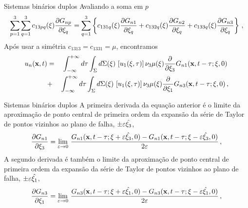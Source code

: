 \documentclass{beamer}
\newcommand{\xvec}{\mathbf{x}}
\newcommand{\xivec}{\boldmath \xi}
\begin{document}
\begin{frame}{Sistemas binários duplos}
	\small
	Avaliando a soma em $p$ 
	\begin{eqnarray*}
		\sum_{p=1}^{3} \sum_{q=1}^{3} c_{13pq}(\xivec) \frac{\partial G_{np} }{\partial \xi_q}  = \sum_{q=1}^{3}\left\{ c_{131q}(\xivec) \frac{\partial  G_{n1}}{\partial \xi_q} +  c_{132q}(\xivec) \frac{\partial G_{n2}}{\partial \xi_q}  + c_{133q}(\xivec) \frac{\partial G_{n3}}{\partial \xi_q}  \right\} \, ,
	\end{eqnarray*}
Ap\'os usar a sim\'etria $c_{1313} = c_{1331} = \mu$, encontramos
\begin{eqnarray}
\label{feq12}
u_{n}(\xvec,t) &=& \int_{-\infty }^{+\infty}d\tau\int_{\Sigma}d\Sigma(\xivec) 
\, \left[ u_{1}(\xivec,\tau)\right] \nu_{3} \mu(\xivec) \frac{\partial }{\partial \xi_3}G_{n1}(\xvec,t-\tau;\xivec,0) \, \nonumber\\
&+&\int_{-\infty }^{+\infty}d\tau\int_{\Sigma}d\Sigma(\xivec) 
\, \left[ u_{1}(\xivec,\tau)\right] \nu_{3} \mu(\xivec) \frac{\partial}{\partial \xi_1}G_{n3}(\xvec,t-\tau;\xivec,0)  \, ,  \nonumber            
\end{eqnarray}
	
\end{frame}
\begin{frame}{Sistemas binários duplos}
		\justifying
A primeira derivada da equação anterior \'e o limite 
	da aproxima\c{c}\~ao de ponto central de primeira ordem da expans\~ao da s\'erie de Taylor de pontos vizinhos 
	ao plano de falha, $\pm\varepsilon\hat{\xivec_3}$,
	\begin{eqnarray*}   
		\frac{\partial G_{n1}}{\partial \xi_3}  =  \lim_{\varepsilon \rightarrow 0} \, \frac{G_{n1}(\xvec,t-\tau;\xivec + \varepsilon \hat{\xivec_3},0) - G_{n1}(\xvec,t-\tau;\xivec - \varepsilon \hat{\xivec_3} ,0) }{2\varepsilon} \, ,            
	\end{eqnarray*}
A segundo derivada 
 \'e tamb\'em o limite 
da aproxima\c{c}\~ao de ponto central de primeira ordem da expans\~ao da s\'erie de Taylor de pontos vizinhos 
ao plano de falha, $\pm\varepsilon\hat{\xivec_1}$,
\begin{eqnarray*}   
	\frac{\partial G_{n3}}{\partial \xi_1}  =  \lim_{\varepsilon \rightarrow 0} \, \frac{G_{n3}(\xvec,t-\tau;\xivec + \varepsilon \hat{\xivec_1},0) - G_{n3}(\xvec,t-\tau;\xivec - \varepsilon \hat{\xivec_1} ,0) }{2\varepsilon} \, ,            
\end{eqnarray*}
\end{frame}
\end{document}
